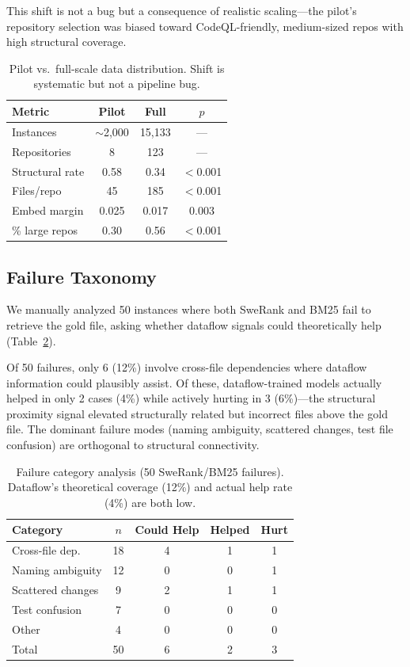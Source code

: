 \documentclass[11pt,a4paper]{article}
\begin{document}
This shift is not a bug but a consequence of realistic scaling---the pilot's repository selection was biased toward CodeQL-friendly, medium-sized repos with high structural coverage.

\begin{table}[t]
\centering
\small
\caption{Pilot vs.\ full-scale data distribution. Shift is systematic but not a pipeline bug.}
\label{tab:audit}
\begin{tabular}{lccc}
\toprule
Metric & Pilot & Full & $p$ \\
\midrule
Instances       & ${\sim}$2,000 & 15,133 & --- \\
Repositories    & 8         & 123   & --- \\
Structural rate & 0.58      & 0.34  & $<$0.001 \\
Files/repo      & 45        & 185   & $<$0.001 \\
Embed margin    & 0.025     & 0.017 & 0.003 \\
\% large repos  & 0.30      & 0.56  & $<$0.001 \\
\bottomrule
\end{tabular}
\end{table}

\subsection{Failure Taxonomy}
\label{sec:failure}

We manually analyzed 50 instances where both SweRank and BM25 fail to retrieve the gold file, asking whether dataflow signals could theoretically help (Table~\ref{tab:failure}).

Of 50 failures, only 6 (12\%) involve cross-file dependencies where dataflow information could plausibly assist.
Of these, dataflow-trained models actually helped in only 2 cases (4\%) while actively hurting in 3 (6\%)---the structural proximity signal elevated structurally related but incorrect files above the gold file.
The dominant failure modes (naming ambiguity, scattered changes, test file confusion) are orthogonal to structural connectivity.

\begin{table}[t]
\centering
\small
\caption{Failure category analysis (50 SweRank/BM25 failures). Dataflow's theoretical coverage (12\%) and actual help rate (4\%) are both low.}
\label{tab:failure}
\begin{tabular}{lcccc}
\toprule
Category & $n$ & Could Help & Helped & Hurt \\
\midrule
Cross-file dep.     & 18 & 4 & 1 & 1 \\
Naming ambiguity    & 12 & 0 & 0 & 1 \\
Scattered changes   &  9 & 2 & 1 & 1 \\
Test confusion      &  7 & 0 & 0 & 0 \\
Other               &  4 & 0 & 0 & 0 \\
\midrule
Total               & 50 & 6 & 2 & 3 \\
\bottomrule
\end{tabular}
\end{table}
\end{document}
